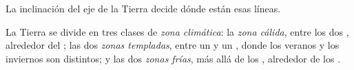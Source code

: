 La inclinación del eje de la Tierra decide dónde están esas líneas.

\begin{definition}\label{def:g5:weather-and-climate:climate-zone}
La Tierra se divide en tres clases de \emph{zona climática}: la \emph{zona cálida}, entre los dos ,
alrededor del ; las dos \emph{zonas templadas}, entre un  y
un , donde los veranos y los inviernos son distintos; y las dos
\emph{zonas frías}, más allá de los , alrededor de los
.
\end{definition}

